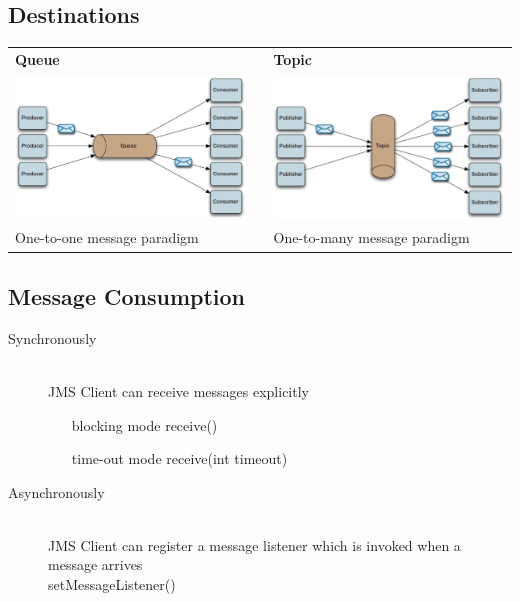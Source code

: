 \documentclass[10pt]{article}
\begin{document}
\subsection{Destinations}
\begin{tabular}{l p{2cm} l}
	\textbf{Queue} && \textbf{Topic} \\
	\includegraphics[scale=0.3]{jms-destination-queue.png} && \includegraphics[scale=0.3]{jms-destination-topic.png} \\
	One-to-one message paradigm && One-to-many message paradigm	
\end{tabular}
\subsection{Message Consumption}
\begin{description}
	\item[Synchronously] \hfill \\
		JMS Client can receive messages explicitly
		\begin{itemize}
			\item[blocking mode] receive()
			\item[time-out mode] receive(int timeout)
		\end{itemize}
	\item[Asynchronously] \hfill \\
		JMS Client can register a message listener which is invoked when a message arrives \\
		setMessageListener()
\end{description}
\end{document}
